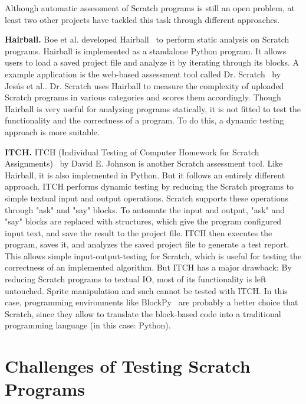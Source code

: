 Although automatic assessment of Scratch programs is still an open problem,
at least two other projects have tackled this task through different approaches.

\textbf{Hairball.}
Boe et al. developed Hairball~\cite{hairball} to perform static analysis on Scratch programs.
Hairball is implemented as a standalone Python program.
It allows users to load a saved project file and analyze it by iterating through its blocks.
A example application is the web-based assessment tool called Dr. Scratch~\cite{drscratch} by Jes\'{u}s et al..
Dr. Scratch uses Hairball to measure the complexity of uploaded Scratch programs in various categories and scores them accordingly.
Though Hairball is very useful for analyzing programs statically, it is not fitted to test the functionality and the correctness of a program.
To do this, a dynamic testing approach is more suitable.

\textbf{ITCH.}
ITCH (Individual Testing of Computer Homework for Scratch Assignments)~\cite{itch} by David E. Johnson is another Scratch assessment tool.
Like Hairball, it is also implemented in Python.
But it follows an entirely different approach.
ITCH performs dynamic testing by reducing the Scratch programs to simple textual input and output operations.
Scratch supports these operations through "ask" and "say" blocks.
To automate the input and output, "ask" and "say" blocks are replaced with structures, which give the program configured input text, and save the result to the project file.
ITCH then executes the program, saves it, and analyzes the saved project file to generate a test report.
This allows simple input-output-testing for Scratch, which is useful for testing the correctness of an implemented algorithm.
But ITCH has a major drawback: By reducing Scratch programs to textual IO, most of its functionality is left untouched.
Sprite manipulation and such cannot be tested with ITCH.
In this case, programming environments like BlockPy~\cite{blockpy} are probably a better choice that Scratch,
since they allow to translate the block-based code into a traditional programming language (in this case: Python).

\section{Challenges of Testing Scratch Programs}

